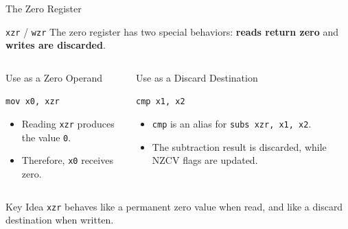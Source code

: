 \documentclass[aspectratio=169,11pt,t]{beamer}
\newcommand{\key}[1]{\textbf{#1}}
\newcommand{\code}[1]{\texttt{#1}}
\begin{document}

\begin{frame}{The Zero Register}

\begin{block}{\code{xzr} / \code{wzr}}
The zero register has two special behaviors:
\key{reads return zero}
and
\key{writes are discarded}.
\end{block}

\vspace{-0.25cm}

\begin{columns}[T,onlytextwidth]


\begin{block}{Use as a Zero Operand}

\begin{center}
\large
\code{mov x0, xzr}
\end{center}

\begin{itemize}
  \item Reading \code{xzr}
        produces the value \code{0}.
  \item Therefore,
        \code{x0} receives zero.
\end{itemize}

\end{block}


\begin{block}{Use as a Discard Destination}

\begin{center}
\large
\code{cmp x1, x2}
\end{center}

\begin{itemize}
  \item \code{cmp} is an alias for
        \code{subs xzr, x1, x2}.
  \item The subtraction result is discarded,
        while NZCV flags are updated.
\end{itemize}

\end{block}

\end{columns}

\vspace{0.1cm}

\begin{block}{Key Idea}
\code{xzr} behaves like a permanent zero value
when read,
and like a discard destination when written.
\end{block}

\end{frame}
\end{document}
